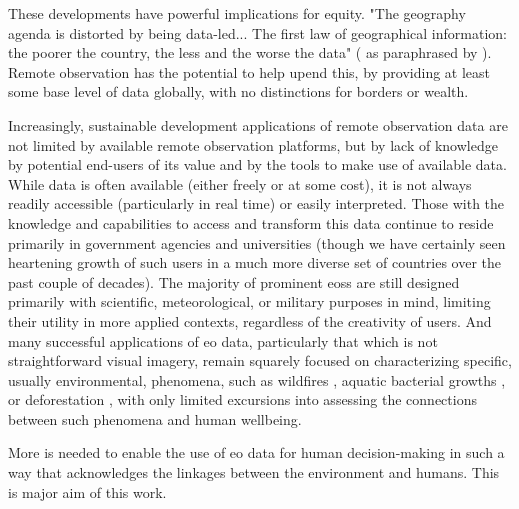 These developments have powerful implications for equity. "The geography agenda is distorted by being data-led... The first law of geographical information: the poorer the country, the less and the worse the data"  (\cite{overton1991further} as paraphrased by \cite{taylorGeographicInformationSystems1994}). Remote observation has the potential to help upend this, by providing at least some base level of data globally, with no distinctions for borders or wealth.

Increasingly, sustainable development applications of remote observation data are not limited by available remote observation platforms, but by lack of knowledge by potential end-users of its value and by the tools to make use of available data. While data is often available (either freely or at some cost), it is not always readily accessible (particularly in real time) or easily interpreted. Those with the knowledge and capabilities to access and transform this data continue to reside primarily in government agencies and universities (though we have certainly seen heartening growth of such users in a much more diverse set of countries over the past couple of decades). The majority of prominent \acp{eos} are still designed primarily with scientific, meteorological, or military purposes in mind, limiting their utility in more applied contexts, regardless of the creativity of users. And many successful applications of \ac{eo} data, particularly that which is not straightforward visual imagery, remain squarely focused on characterizing specific, usually environmental, phenomena, such as wildfires \cite{schroederNewVIIRS375m2014},  aquatic bacterial growths \cite{stromingQuantifyingHumanHealth2020}, or deforestation \cite{lagomasinoMeasuringMangroveCarbon2019}, with only limited excursions into assessing the connections between such phenomena and human wellbeing.

More is needed to enable the use of \ac{eo} data for human decision-making in such a way that acknowledges the linkages between the environment and humans. This is major aim of this work. 


\subsection{} \label{sec:gis}

